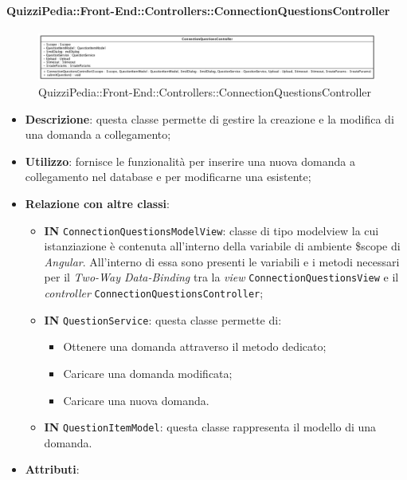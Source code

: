 \paragraph{QuizziPedia::Front-End::Controllers::ConnectionQuestionsController}
\begin{figure} [ht]
	\centering
	\includegraphics[scale=0.30]{UML/Classi/Front-End/QuizziPedia_Front-end_Controller_ConnectionQuestionsController.png}
	\caption{QuizziPedia::Front-End::Controllers::ConnectionQuestionsController}
\end{figure} \FloatBarrier
\begin{itemize}
	\item \textbf{Descrizione}: questa classe permette di gestire la creazione e la modifica di una domanda a collegamento;
	\item \textbf{Utilizzo}: fornisce le funzionalità per inserire una nuova domanda a collegamento nel database e per modificarne una esistente;
	\item \textbf{Relazione con altre classi}:
	\begin{itemize}
		\item \textbf{IN} \texttt{ConnectionQuestionsModelView}: classe di tipo modelview la cui istanziazione è contenuta all'interno della variabile di ambiente \$scope di \textit{Angular}. All'interno di essa sono presenti le variabili e i metodi necessari per il \textit{Two-Way Data-Binding} tra la \textit{view} \texttt{ConnectionQuestionsView} e il \textit{controller} \texttt{ConnectionQuestionsController};
		\item \textbf{IN} \texttt{QuestionService}: questa classe permette di:
		\begin{itemize}
			\item Ottenere una domanda attraverso il metodo dedicato;
			\item Caricare una domanda modificata;
			\item Caricare una nuova domanda.
		\end{itemize}
		\item \textbf{IN} \texttt{QuestionItemModel}: questa classe rappresenta il modello di una domanda.
	\end{itemize}
	\item \textbf{Attributi}:
	\begin{itemize}

\end{itemize}
\end{itemize}
